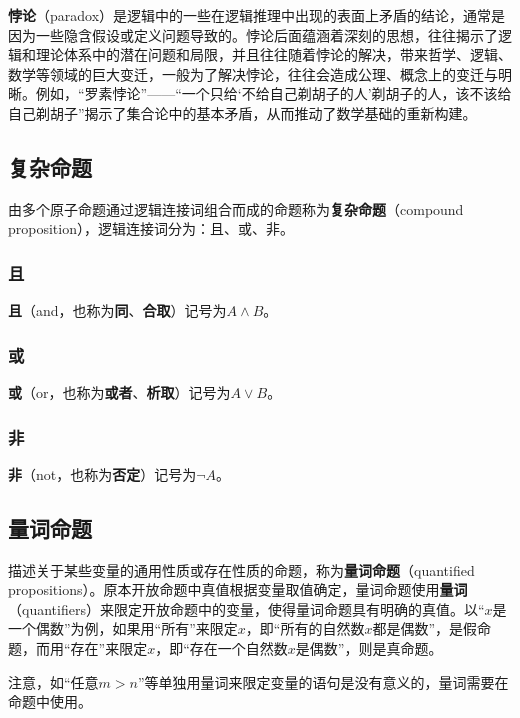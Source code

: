 \textbf{悖论}（paradox）是逻辑中的一些在逻辑推理中出现的表面上矛盾的结论，通常是因为一些隐含假设或定义问题导致的。悖论后面蕴涵着深刻的思想，往往揭示了逻辑和理论体系中的潜在问题和局限，并且往往随着悖论的解决，带来哲学、逻辑、数学等领域的巨大变迁，一般为了解决悖论，往往会造成公理、概念上的变迁与明晰。例如，“罗素悖论”——“一个只给‘不给自己剃胡子的人’剃胡子的人，该不该给自己剃胡子”揭示了集合论中的基本矛盾，从而推动了数学基础的重新构建。

\subsection{复杂命题}\label{sub_HsLogi_1}

由多个原子命题通过逻辑连接词组合而成的命题称为\textbf{复杂命题}（compound proposition），逻辑连接词分为：且、或、非。

\subsubsection{且}

\textbf{且}（and，也称为\textbf{同}、\textbf{合取}）记号为$A\land B$。

\subsubsection{或}

\textbf{或}（or，也称为\textbf{或者}、\textbf{析取}）记号为$A\lor B$。

\subsubsection{非}

\textbf{非}（not，也称为\textbf{否定}）记号为$\lnot A$。

\subsection{量词命题}

描述关于某些变量的通用性质或存在性质的命题，称为\textbf{量词命题}（quantified propositions）。原本开放命题中真值根据变量取值确定，量词命题使用\textbf{量词}（quantifiers）来限定开放命题中的变量，使得量词命题具有明确的真值。以“$x$是一个偶数”为例，如果用“所有”来限定$x$，即“所有的自然数$x$都是偶数”，是假命题，而用“存在”来限定$x$，即“存在一个自然数$x$是偶数”，则是真命题。

注意，如“任意$m>n$”等单独用量词来限定变量的语句是没有意义的，量词需要在命题中使用。

